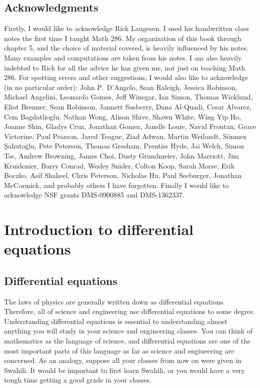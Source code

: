 

\subsection{Acknowledgments}

Firstly, I would like to acknowledge Rick Laugesen.  I used his handwritten
class notes
the first time I taught
Math 286.  My organization of this book through chapter 5,
and the choice of
material covered, is heavily influenced by his notes.  Many
examples and computations are taken from his notes.  I am also heavily
indebted to Rick for all the advice he has given me, not just on teaching
Math 286.
For spotting errors and other suggestions,
I would also like to acknowledge (in no particular order):
John P.\ D'Angelo,
Sean Raleigh, Jessica Robinson, Michael Angelini, Leonardo Gomes, Jeff
Winegar, Ian Simon, Thomas Wicklund, Eliot Brenner, Sean Robinson,
Jannett Susberry, Dana Al-Quadi, Cesar Alvarez, Cem Bagdatlioglu,
Nathan Wong, Alison Shive, Shawn White, Wing Yip Ho, Joanne Shin,
Gladys Cruz, Jonathan Gomez, Janelle Louie, Navid Froutan,
Grace Victorine, Paul Pearson, Jared Teague, Ziad Adwan,
Martin Weilandt, S\"{o}nmez \c{S}ahuto\u{g}lu,
Pete Peterson, Thomas Gresham, Prentiss Hyde, Jai Welch,
Simon Tse, Andrew Browning, James Choi, Dusty Grundmeier,
John Marriott,
Jim Kruidenier,
Barry Conrad,
Wesley Snider,
Colton Koop,
Sarah Morse,
Erik Boczko,
Asif Shakeel,
Chris Peterson,
Nicholas Hu,
Paul Seeburger,
Jonathan McCormick,
and probably others I
have forgotten.
Finally I would like
to acknowledge NSF grants DMS-0900885 and DMS-1362337.



\sectionnewpage
\section{Introduction to differential equations}
\label{introde:section}


\subsection{Differential equations}

The laws of physics are generally written down as differential
equations.  Therefore, all of science and engineering use
differential equations to some degree.  Understanding
differential equations is essential to understanding almost anything you will
study in your science and engineering classes.
You can think of mathematics as the language of science, and
differential equations are one of the most important parts of this
language as far as science and engineering are concerned.  As an analogy,
suppose all your classes from now on were given in Swahili.  
It would be important to first learn Swahili, or you would have a very
tough time getting a good grade in your classes.

